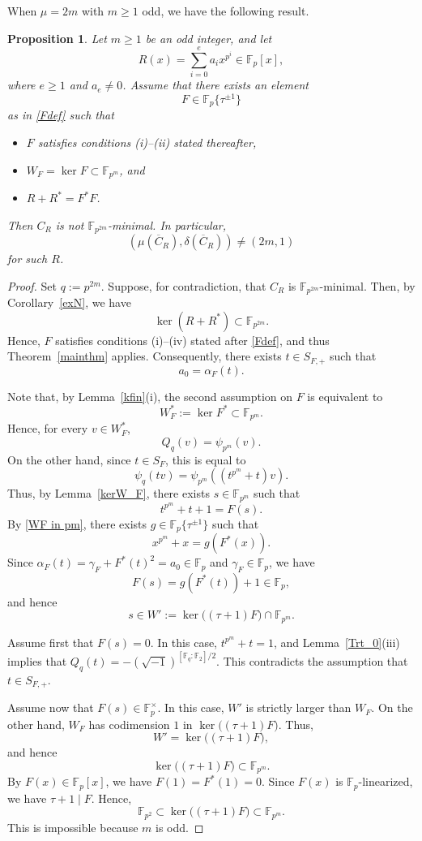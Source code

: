 \documentclass[12pt,a4paper]{amsart}
\newtheorem{proposition}[theorem]{Proposition}
\theoremstyle{definition}
\def\F{{\mathbb F}}
\theoremstyle{remark}
\begin{document}
When $\mu=2m$ with $m\geq1$ odd, we have the following result. 
\begin{proposition}\label{2odd impossible}
Let $m\geq1$ be an odd integer, and let 
\[
R(x)=\sum_{i=0}^ea_ix^{p^i}\in \F_p[x], 
\]
where $e\geq1$ and $a_e\neq0$. Assume that there exists an element 
\[F\in \F_p\{\tau^{\pm1}\} 
\]
as in \eqref{Fdef} such that 
\begin{itemize}
    \item $F$ satisfies conditions \textup{(i)--(ii)} stated thereafter, 
    \item $W_F=\ker F\subset \F_{p^m}$, and 
    \item $R+R^\ast=F^\ast F$. 
\end{itemize}
Then $C_R$ is not $\F_{p^{2m}}$-minimal. In particular, 
\[
(\mu(\overline{C}_R),\delta(\overline{C}_R))\neq (2m,1)
\]
for such $R$. 
\end{proposition}
\begin{proof}
Set $q:=p^{2m}$. Suppose, for contradiction, that $C_R$ is $\F_{p^{2m}}$-minimal. Then, by Corollary~\ref{exN}, we have 
\[
\ker (R+R^\ast)\subset \F_{p^{2m}}. 
\]
Hence, $F$ satisfies conditions \textup{(i)--(iv)} stated after \eqref{Fdef}, and thus Theorem~\ref{mainthm} applies. Consequently, there exists $t\in S_{F,+}$ such that 
\[
a_0=\alpha_F(t). 
\]

Note that, by Lemma~\ref{kfin}(i), the second assumption on $F$ is equivalent to 
\begin{equation}\label{WF in pm}
    W_F^\ast:=\ker F^\ast \subset \F_{p^m}. 
\end{equation}
Hence, for every $v\in W_F^\ast$, 
\[
Q_q(v)=\psi_{p^m}(v). 
\]
On the other hand, since $t\in S_{F}$, this is equal to 
\[
\psi_q(tv)=\psi_{p^m}((t^{p^m}+t)v). 
\]
Thus, by Lemma~\ref{kerW_F}, there exists $s\in \F_{p^m}$ such that 
\[
t^{p^m}+t+1=F(s). 
\]
By \eqref{WF in pm}, there exists $g\in \F_p\{\tau^{\pm1}\}$ such that 
\[
x^{p^m}+x=g(F^\ast(x)). 
\]
Since $\alpha_F(t)=\gamma_F+F^\ast(t)^2=a_0\in\F_p$ and $\gamma_F\in \F_p$, we have 
\[
F(s)=g(F^\ast(t))+1\in\F_p, 
\]
and hence 
\[
s\in W':=\ker\bigl((\tau+1)F\bigr)\cap \F_{p^m}. 
\]

Assume first that $F(s)=0$. In this case, $t^{p^m}+t=1$, and Lemma~\ref{Trt_0}(iii) implies that $Q_q(t)=-(\sqrt{-1})^{[\F_q:\F_2]/2}$. This contradicts the assumption that $t\in S_{F,+}$. 

Assume now that $F(s)\in\F_p^\times$. In this case, $W'$ is strictly larger than $W_F$. On the other hand, $W_F$ has codimension $1$ in $\ker\bigl((\tau+1)F\bigr)$. Thus, 
\[
W'=\ker\bigl((\tau+1)F\bigr), 
\]
and hence 
\[
\ker\bigl((\tau+1)F\bigr)\subset \F_{p^m}. 
\]
By $F(x) \in \F_p[x]$, we have 
$F(1)=F^\ast(1)=0$. 
Since $F(x)$ is $\F_p$-linearized, we have 
$\tau+1\mid F$. Hence,  
\[
\F_{p^2}\subset \ker\bigl((\tau+1)F\bigr)\subset \F_{p^m}. 
\]
This is impossible because $m$ is odd. 
\end{proof}
\end{document}
